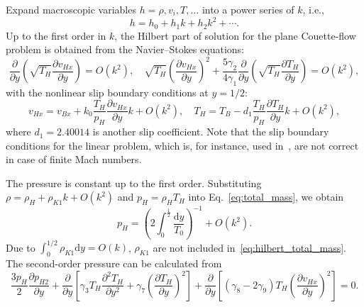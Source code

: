 \documentclass[]{elsarticle} %
\newcommand{\dd}{\mathrm{d}}
\newcommand{\pder}[2][]{\frac{\partial#1}{\partial#2}}
\newcommand{\pderdual}[2][]{\frac{\partial^2#1}{\partial#2^2}}
\newcommand{\OO}[1]{O(#1)}
\begin{document}
Expand macroscopic variables \(h = \rho, v_i, T, \dots\) into a power series of \(k\), i.e.,
\begin{equation}\label{eq:solution_expansion}
    h = h_0 + h_1k + h_2k^2 + \cdots.
\end{equation}
Up to the first order in \(k\), the Hilbert part of solution for the plane Couette-flow problem
is obtained from the Navier--Stokes equations:
\begin{equation}\label{eq:Hilbert_part}
    \pder{y}\left(\sqrt{T_H}\pder[v_{Hx}]{y}\right) = \OO{k^2}, \quad
    \sqrt{T_H}\left(\pder[v_{Hx}]{y}\right)^2 + \frac{5\gamma_2}{4\gamma_1}\pder{y}\left(\sqrt{T_H}\pder[T_H]{y}\right) = \OO{k^2},
\end{equation}
with the nonlinear slip boundary conditions at \(y=1/2\):
\begin{equation}\label{eq:Hilbert_BC}
    v_{Hx} = v_{Bx} + k_0\frac{T_H}{p_H}\pder[v_{Hx}]{y}k + \OO{k^2}, \quad T_H = T_B - d_1\frac{T_H}{p_H}\pder[T_H]{y}k + \OO{k^2},
\end{equation}
where \(d_1 = 2.40014\) is another slip coefficient.
Note that the slip boundary conditions for the linear problem, which is, for instance,
used in~\citet{Sharipov2000}, are not correct in case of finite Mach numbers.

The pressure is constant up to the first order.
Substituting \(\rho = \rho_H + \rho_{K1}k + \OO{k^2}\) and \(p_H = \rho_H T_H\)
into Eq.~\eqref{eq:total_mass}, we obtain
\begin{equation}\label{eq:hilbert_total_mass}
    p_H = \left(2\int_0^\frac12\frac{\dd y}{T_0}\right)^{-1} + \OO{k^2}.
\end{equation}
Due to \(\int_{0}^{1/2}\rho_{K1}\dd{y} = \OO{k}\), \(\rho_{K1}\) are not included in~\eqref{eq:hilbert_total_mass}.
The second-order pressure can be calculated from
\begin{equation}\label{eq:hilbert_p2}
    \frac{3p_H}{2}\pder[p_{H2}]{y}
        + \pder{y}\left[ \gamma_3 T_H \pderdual[T_H]{y} + \gamma_7\left(\pder[T_H]{y}\right)^2 \right]
        + \pder{y}\left[ (\gamma_8-2\gamma_9)T_H\left(\pder[v_{Hx}]{y}\right)^2 \right] = 0.
\end{equation}
\end{document}
